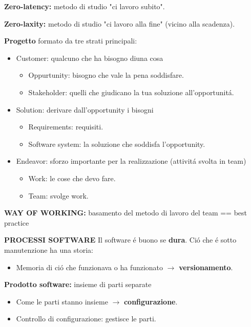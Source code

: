\documentclass{article}
\begin{document}
\bigbreak
\textbf{Zero-latency: }metodo di studio "ci lavoro subito".

\bigbreak
\textbf{Zero-laxity: }metodo di studio "ci lavoro alla fine" (vicino alla scadenza).

\bigbreak
\textbf{Progetto} formato da tre strati principali:
    \begin{itemize}
        \item Customer: qualcuno che ha bisogno diuna cosa
            \begin{itemize}
                \item Oppurtunity: bisogno che vale la pena soddisfare.
                \item Stakeholder: quelli che giudicano la tua soluzione all'opportunit\'a.
            \end{itemize}
        \item Solution: derivare dall'opportunity i bisogni
            \begin{itemize}
                \item Requirements: requisiti.
                \item Software system: la soluzione che soddisfa l'opportunity.
            \end{itemize}
        \item Endeavor: sforzo importante per la realizzazione (attivit\'a svolta in team)
            \begin{itemize}
                \item Work: le cose che devo fare.
                \item Team: svolge work.
            \end{itemize}
    \end{itemize}
\textbf{WAY OF WORKING: }basamento del metodo di lavoro del team == best practice

\newpage

\textbf{PROCESSI SOFTWARE}
\bigbreak
Il software \'e buono se \textbf{dura}.
\bigbreak
Ci\'o che \'e sotto manutenzione ha una storia:
    \begin{itemize}
        \item Memoria di ci\'o che funzionava o ha funzionato $\rightarrow$ \textbf{versionamento}.
    \end{itemize}
\textbf{Prodotto software: }insieme di parti separate
    \begin{itemize}
        \item Come le parti stanno insieme $\rightarrow$ \textbf{configurazione}.
        \item Controllo di configurazione: gestisce le parti.
    \end{itemize}
\end{document}
